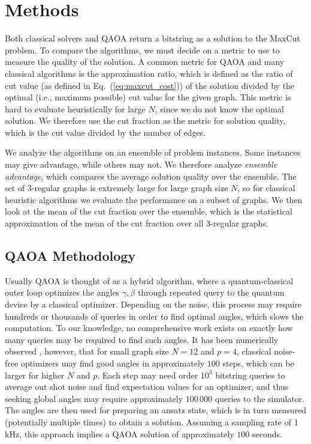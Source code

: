 
\section{Methods}\label{sec:methodology}

Both classical solvers and QAOA return a bitstring as a solution to the MaxCut problem. To compare the algorithms,
we must decide on a metric to use to measure the quality of the solution. A common metric for QAOA and many classical algorithms is the approximation ratio, which is defined as the ratio of cut value (as defined in Eq.~(\ref{eq:maxcut_cost})) of the solution divided by the optimal (i.e., maximum possible) cut value for the given graph.
This metric is hard to evaluate heuristically for large $N$, since we do not know the optimal solution. We therefore use the cut fraction as the metric for solution quality, which is the cut value divided by the number of edges.

We analyze the algorithms on an ensemble of problem instances. Some instances may give advantage, while others may not. We 
therefore analyze \emph{ensemble advantage},
which compares the average solution quality over the ensemble.
The set of 3-regular graphs is extremely large for large graph size $N$, so for classical heuristic algorithms we evaluate the performance on a subset of graphs.
We then look at the mean of the cut fraction over the ensemble, which is the statistical approximation of the mean of the cut fraction over all 3-regular graphs.

\subsection{QAOA Methodology}


Usually  QAOA is thought of as a hybrid algorithm, where a quantum-classical outer loop optimizes the angles $\gamma,\beta$ through repeated query to the quantum device by a classical optimizer. Depending on the noise, this process may require hundreds or thousands of queries in order to find optimal angles, which slows the computation. To our knowledge,  no comprehensive work exists on exactly how many queries may be required to find such angles. It has been numerically observed \cite{Shaydulin_2019,Zhou2020}, however, that for small graph size $N=12$ and $p=4$, classical noise-free optimizers may find good angles in approximately $100$ steps, which can be larger for higher $N$ and $p$. Each step may need order $10^3$  bitstring queries to average out shot noise and find expectation values for an optimizer, and thus seeking global angles may require approximately $100\,000$ queries to the simulator.
The angles are then used for preparing an ansatz state, which is in turn measured (potentially multiple times) to obtain a solution.
Assuming a sampling rate of 1 kHz, this approach implies a QAOA solution of approximately  $100$ seconds.


